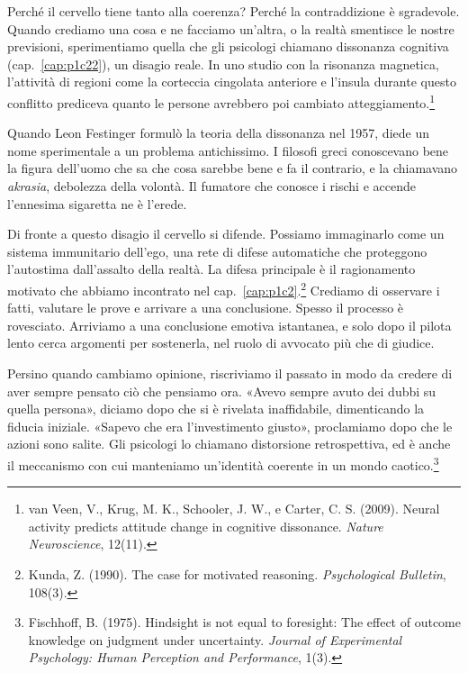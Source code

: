 
Perché il cervello tiene tanto alla coerenza? Perché la contraddizione è sgradevole. Quando crediamo una cosa e ne facciamo un'altra, o la realtà smentisce le nostre previsioni, sperimentiamo quella che gli psicologi chiamano dissonanza cognitiva (cap.~\ref{cap:p1c22}), un disagio reale. In uno studio con la risonanza magnetica, l'attività di regioni come la corteccia cingolata anteriore e l'insula durante questo conflitto prediceva quanto le persone avrebbero poi cambiato atteggiamento.\footnote{van Veen, V., Krug, M. K., Schooler, J. W., e Carter, C. S. (2009). Neural activity predicts attitude change in cognitive dissonance. \textit{Nature Neuroscience}, 12(11).}

Quando Leon Festinger formulò la teoria della dissonanza nel 1957, diede un nome sperimentale a un problema antichissimo. I filosofi greci conoscevano bene la figura dell'uomo che sa che cosa sarebbe bene e fa il contrario, e la chiamavano \textit{akrasia}, debolezza della volontà. Il fumatore che conosce i rischi e accende l'ennesima sigaretta ne è l'erede.

Di fronte a questo disagio il cervello si difende. Possiamo immaginarlo come un sistema immunitario dell'ego, una rete di difese automatiche che proteggono l'autostima dall'assalto della realtà. La difesa principale è il ragionamento motivato che abbiamo incontrato nel cap.~\ref{cap:p1c2}.\footnote{Kunda, Z. (1990). The case for motivated reasoning. \textit{Psychological Bulletin}, 108(3).} Crediamo di osservare i fatti, valutare le prove e arrivare a una conclusione. Spesso il processo è rovesciato. Arriviamo a una conclusione emotiva istantanea, e solo dopo il pilota lento cerca argomenti per sostenerla, nel ruolo di avvocato più che di giudice.

Persino quando cambiamo opinione, riscriviamo il passato in modo da credere di aver sempre pensato ciò che pensiamo ora. «Avevo sempre avuto dei dubbi su quella persona», diciamo dopo che si è rivelata inaffidabile, dimenticando la fiducia iniziale. «Sapevo che era l'investimento giusto», proclamiamo dopo che le azioni sono salite. Gli psicologi lo chiamano distorsione retrospettiva, ed è anche il meccanismo con cui manteniamo un'identità coerente in un mondo caotico.\footnote{Fischhoff, B. (1975). Hindsight is not equal to foresight: The effect of outcome knowledge on judgment under uncertainty. \textit{Journal of Experimental Psychology: Human Perception and Performance}, 1(3).}

